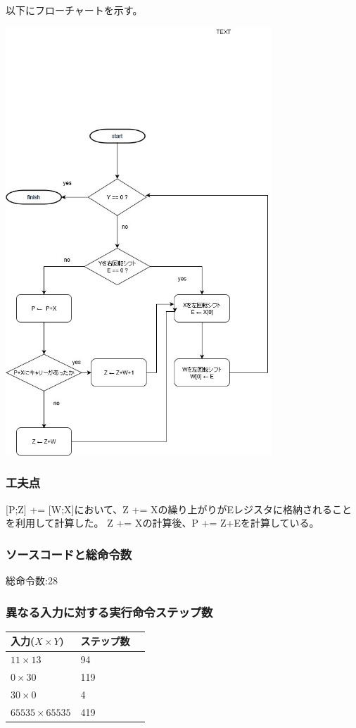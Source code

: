 \documentclass[dvipdfmx,12pt]{jreport}
\begin{document}
以下にフローチャートを示す。

\includegraphics[width=10cm,bb=0 0 604 932]{report1_1_nakata.jpg}


\subsubsection{工夫点}
[P;Z] += [W;X]において、Z += Xの繰り上がりがEレジスタに格納されることを利用して計算した。
Z += Xの計算後、P += Z+Eを計算している。


\subsubsection{ソースコードと総命令数}

総命令数:28

\subsubsection{異なる入力に対する実行命令ステップ数}
\begin{table}[h]
  \begin{tabular}{|l|l|l|} \hline
    入力($X \times Y$) & ステップ数 \\ \hline
    $11 \times 13$ & 94 \\ \hline
    $0 \times 30$ & 119 \\ \hline
    $30 \times 0$ & 4 \\ \hline
    $65535 \times 65535$ & 419 \\ \hline
  \end{tabular}
\end{table}
\end{document}
